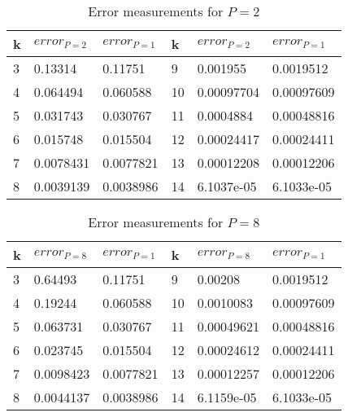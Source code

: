 \documentclass[a4paper]{article} %
\begin{document}
\begin{table}[hbt]
  \begin{center}
    \begin{tabular}{|l|l|l||l|l|l| }
      \hline
      \textbf{k} & \textbf{$error_{P=2}$} & \textbf{$error_{P=1}$} & \textbf{k} & \textbf{$error_{P=2}$} & \textbf{$error_{P=1}$}\\
      \hline
      3 & 0.13314   & 0.11751   & 9 & 0.001955    & 0.0019512  \\ 
      4 & 0.064494  & 0.060588  & 10 & 0.00097704 & 0.00097609 \\ 
      5 & 0.031743  & 0.030767  & 11 & 0.0004884  & 0.00048816 \\ 
      6 & 0.015748  & 0.015504  & 12 & 0.00024417 & 0.00024411 \\ 
      7 & 0.0078431 & 0.0077821 & 13 & 0.00012208 & 0.00012206 \\ 
      8 & 0.0039139 & 0.0038986 & 14 & 6.1037e-05 & 6.1033e-05 \\
      \hline
    \end{tabular}
  \end{center}
  \caption{Error measurements for $P = 2$} \label{tbl:error2}
\end{table}

\begin{table}[hbt]
  \begin{center}
    \begin{tabular}{|l|l|l||l|l|l| }
      \hline
      \textbf{k} & \textbf{$error_{P=8}$} & \textbf{$error_{P=1}$} & \textbf{k} & \textbf{$error_{P=8}$} & \textbf{$error_{P=1}$}\\
      \hline
      3 & 0.64493   & 0.11751   & 9  & 0.00208  & 0.0019512  \\ 
      4 & 0.19244   & 0.060588  & 10 & 0.0010083 & 0.00097609 \\ 
      5 & 0.063731  & 0.030767  & 11 & 0.00049621 & 0.00048816 \\ 
      6 & 0.023745  & 0.015504  & 12 & 0.00024612 & 0.00024411 \\ 
      7 & 0.0098423 & 0.0077821 & 13 & 0.00012257 & 0.00012206 \\ 
      8 & 0.0044137 & 0.0038986 & 14 & 6.1159e-05 & 6.1033e-05 \\
      \hline
    \end{tabular}
  \end{center}
  \caption{Error measurements for $P = 8$} \label{tbl:error8}
\end{table}

\iffalse\begin{figure}[ht!]
\center \texttt{[image: plot.pdf]}
\end{figure}\fi
\end{document}
